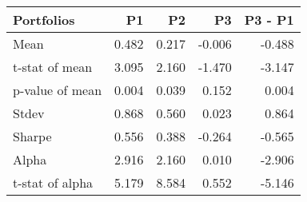 \begin{tabular}{lrrrr}
\toprule
Portfolios & P1 & P2 & P3 & P3 - P1 \\
\midrule
Mean & 0.482 & 0.217 & -0.006 & -0.488 \\
t-stat of mean & 3.095 & 2.160 & -1.470 & -3.147 \\
p-value of mean & 0.004 & 0.039 & 0.152 & 0.004 \\
Stdev & 0.868 & 0.560 & 0.023 & 0.864 \\
Sharpe & 0.556 & 0.388 & -0.264 & -0.565 \\
Alpha & 2.916 & 2.160 & 0.010 & -2.906 \\
t-stat of alpha & 5.179 & 8.584 & 0.552 & -5.146 \\
\bottomrule
\end{tabular}
